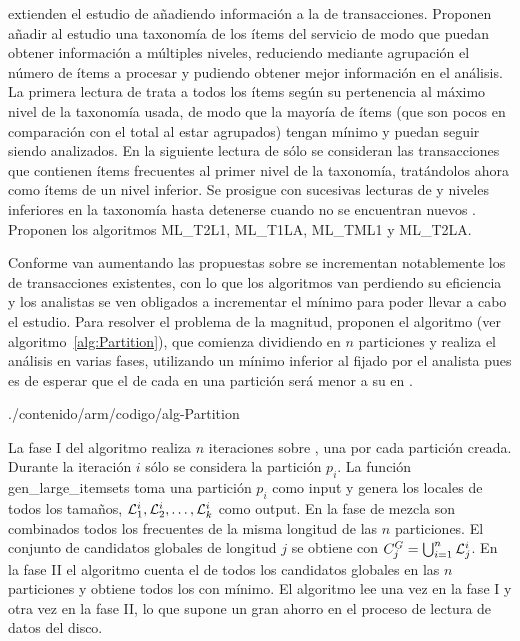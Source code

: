 \citet{HanFu-DiscoveryMultipleLevelARFromLargeDB-1995} extienden el estudio de \ars añadiendo información a la \db de transacciones. Proponen añadir al estudio una taxonomía de los ítems del servicio de modo que puedan obtener información a múltiples niveles, reduciendo mediante agrupación el número de ítems a procesar y pudiendo obtener mejor información en el análisis. La primera lectura de \D trata a todos los ítems según su pertenencia al máximo nivel de la taxonomía usada, de modo que la mayoría de ítems (que son pocos en comparación con el total al estar agrupados) tengan \soporte mínimo y puedan seguir siendo analizados. En la siguiente lectura de \D sólo se consideran las transacciones que contienen ítems frecuentes al primer nivel de la taxonomía, tratándolos ahora como ítems de un nivel inferior. Se prosigue con sucesivas lecturas de \D y niveles inferiores en la taxonomía hasta detenerse cuando no se encuentran nuevos \kitemsets. Proponen los algoritmos {ML\_T2L1}, {ML\_T1LA}, {ML\_TML1} y {ML\_T2LA}.

Conforme van aumentando las propuestas sobre \ARM se incrementan notablemente los \datasets de transacciones existentes, con lo que los algoritmos van perdiendo su eficiencia y los analistas se ven obligados a incrementar el \soporte mínimo para poder llevar a cabo el estudio. Para resolver el problema de la magnitud, \citet{SavasereOmiecinskiNavathe-AnEfficientAlgorithmForARM-1995} proponen el algoritmo  (ver algoritmo~\ref{alg:Partition}), que comienza dividiendo \D en $n$ particiones y realiza el análisis en varias fases, utilizando un \soporte mínimo inferior al fijado por el analista pues es de esperar que el \soporte de cada \itemset en una partición será menor a su \soporte en \D.


                 {./contenido/arm/codigo/alg-Partition}

La fase I del algoritmo realiza $n$ iteraciones sobre \D, una por cada partición creada. Durante la iteración $i$ sólo se considera la partición $p_i$. La función gen\_large\_itemsets toma una partición $p_i$ como input y genera los \kitemsets locales de todos los tamaños, $\aprioriL[1]^i,\aprioriL[2]^i,\ldots,\aprioriL[k]^i$ como output. En la fase de mezcla son combinados todos los \itemsets frecuentes de la misma longitud de las $n$ particiones. El conjunto de candidatos globales de longitud $j$ se obtiene con $C_j^G=\bigcup_{i=1}^n \aprioriL[j]^i$. En la fase II el algoritmo cuenta el \soporte de todos los candidatos globales en las $n$ particiones y obtiene todos los \itemsets con \soporte mínimo. El algoritmo lee \D una vez en la fase I y otra vez en la fase II, lo que supone un gran ahorro en el proceso de lectura de datos del disco.

